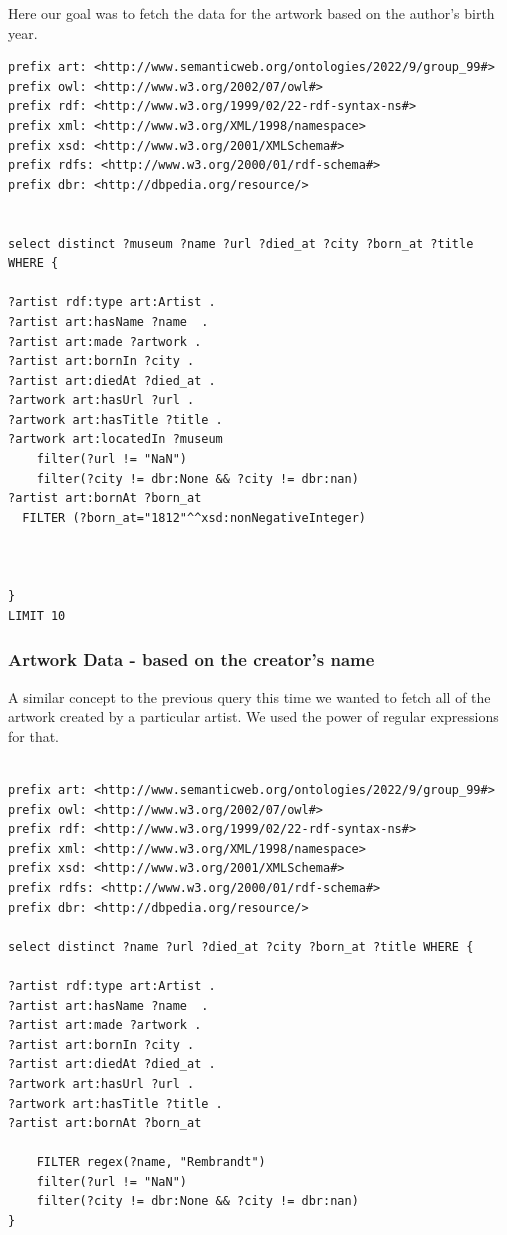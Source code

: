 \documentclass{article}
\begin{document}
Here our goal was to fetch the data for the artwork based on the author's birth year. 

\begin{verbatim}
prefix art: <http://www.semanticweb.org/ontologies/2022/9/group_99#> 
prefix owl: <http://www.w3.org/2002/07/owl#>
prefix rdf: <http://www.w3.org/1999/02/22-rdf-syntax-ns#> 
prefix xml: <http://www.w3.org/XML/1998/namespace> 
prefix xsd: <http://www.w3.org/2001/XMLSchema#> 
prefix rdfs: <http://www.w3.org/2000/01/rdf-schema#> 
prefix dbr: <http://dbpedia.org/resource/>


select distinct ?museum ?name ?url ?died_at ?city ?born_at ?title WHERE { 

?artist rdf:type art:Artist .
?artist art:hasName ?name  .
?artist art:made ?artwork .
?artist art:bornIn ?city .
?artist art:diedAt ?died_at .
?artwork art:hasUrl ?url .
?artwork art:hasTitle ?title .
?artwork art:locatedIn ?museum
    filter(?url != "NaN") 
    filter(?city != dbr:None && ?city != dbr:nan)
?artist art:bornAt ?born_at
  FILTER (?born_at="1812"^^xsd:nonNegativeInteger)



} 
LIMIT 10
\end{verbatim}

\subsubsection{Artwork Data - based on the creator's name}

A similar concept to the previous query this time we wanted to fetch all of the artwork created by a particular artist. We used the power of regular expressions for that. 

\begin{verbatim}

prefix art: <http://www.semanticweb.org/ontologies/2022/9/group_99#>
prefix owl: <http://www.w3.org/2002/07/owl#>
prefix rdf: <http://www.w3.org/1999/02/22-rdf-syntax-ns#>
prefix xml: <http://www.w3.org/XML/1998/namespace>
prefix xsd: <http://www.w3.org/2001/XMLSchema#>
prefix rdfs: <http://www.w3.org/2000/01/rdf-schema#>
prefix dbr: <http://dbpedia.org/resource/>

select distinct ?name ?url ?died_at ?city ?born_at ?title WHERE {
    
?artist rdf:type art:Artist .
?artist art:hasName ?name  .
?artist art:made ?artwork .
?artist art:bornIn ?city .
?artist art:diedAt ?died_at .
?artwork art:hasUrl ?url .
?artwork art:hasTitle ?title .
?artist art:bornAt ?born_at

    FILTER regex(?name, "Rembrandt")
    filter(?url != "NaN")
    filter(?city != dbr:None && ?city != dbr:nan)
}
\end{verbatim}
\end{document}
